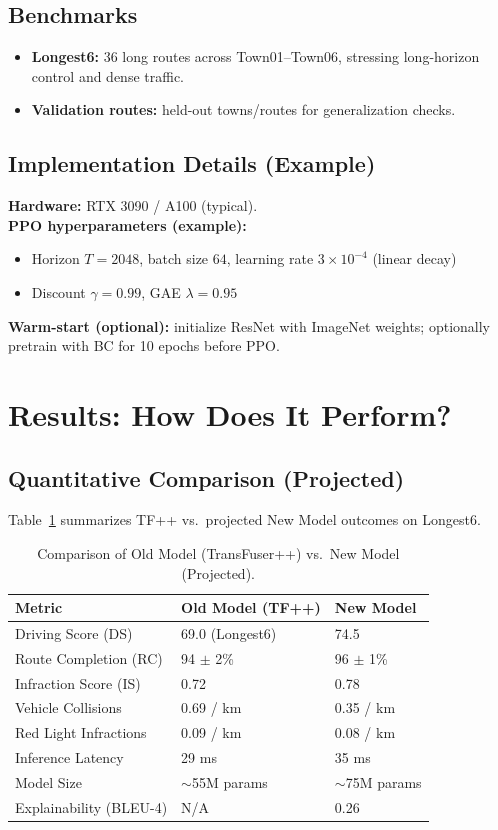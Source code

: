 \documentclass[11pt]{article}
\begin{document}
\subsection{Benchmarks}
\begin{itemize}[leftmargin=1.2em]
  \item \textbf{Longest6:} 36 long routes across Town01--Town06, stressing long-horizon control and dense traffic.
  \item \textbf{Validation routes:} held-out towns/routes for generalization checks.
\end{itemize}

\subsection{Implementation Details (Example)}
\textbf{Hardware:} RTX 3090 / A100 (typical).\\
\textbf{PPO hyperparameters (example):}
\begin{itemize}[leftmargin=1.2em]
  \item Horizon $T=2048$, batch size $64$, learning rate $3\times10^{-4}$ (linear decay)
  \item Discount $\gamma=0.99$, GAE $\lambda=0.95$
\end{itemize}
\textbf{Warm-start (optional):} initialize ResNet with ImageNet weights; optionally pretrain with BC for 10 epochs before PPO.

\section{Results: How Does It Perform?}

\subsection{Quantitative Comparison (Projected)}
Table~\ref{tab:compare} summarizes TF++ vs.\ projected New Model outcomes on Longest6.

\begin{table}[h]
\centering
\caption{Comparison of Old Model (TransFuser++) vs.\ New Model (Projected).}
\label{tab:compare}
\begin{tabular}{@{}lll@{}}
\toprule
\textbf{Metric} & \textbf{Old Model (TF++)} & \textbf{New Model} \\
\midrule
Driving Score (DS) & 69.0 (Longest6) & 74.5 \\
Route Completion (RC) & 94 $\pm$ 2\% & 96 $\pm$ 1\% \\
Infraction Score (IS) & 0.72 & 0.78 \\
Vehicle Collisions & 0.69 / km & 0.35 / km \\
Red Light Infractions & 0.09 / km & 0.08 / km \\
Inference Latency & 29 ms & 35 ms \\
Model Size & $\sim$55M params & $\sim$75M params \\
Explainability (BLEU-4) & N/A & 0.26 \\
\bottomrule
\end{tabular}
\end{table}
\end{document}

